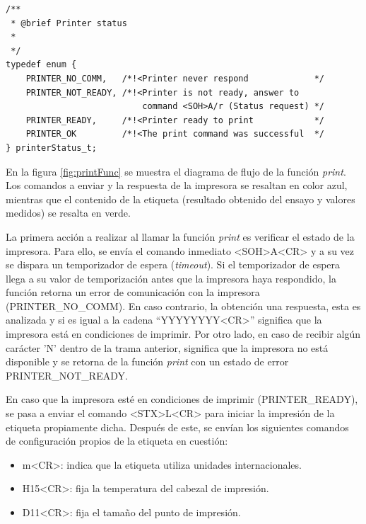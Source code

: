  \begin{lstlisting}[label=cod:print_h,caption=Prototipo función print.]
/**
 * @brief Printer status
 * 
 */
typedef enum {
	PRINTER_NO_COMM,   /*!<Printer never respond             */
	PRINTER_NOT_READY, /*!<Printer is not ready, answer to 
	                       command <SOH>A/r (Status request) */
	PRINTER_READY,     /*!<Printer ready to print            */
	PRINTER_OK         /*!<The print command was successful  */
} printerStatus_t;
\end{lstlisting}

En la figura \ref{fig:printFunc} se muestra el diagrama de flujo de la función \textit{print}. Los comandos a enviar y la respuesta de la impresora se resaltan en color azul, mientras que el contenido de la etiqueta (resultado obtenido del ensayo y valores medidos) se resalta en verde.

La primera acción a realizar al llamar la función \textit{print} es verificar el estado de la impresora. Para ello, se envía el comando inmediato \textless{}SOH\textgreater{}A\textless{}CR\textgreater{} y a su vez se dispara un temporizador de espera (\textit{timeout}). Si el temporizador de espera llega a su valor de temporización antes que la impresora haya respondido, la función retorna un error de comunicación con la impresora (PRINTER\_NO\_COMM). En caso contrario, la obtención una respuesta, esta es analizada y si es igual a la cadena ``YYYYYYYY\textless{}CR\textgreater{}'' significa que la impresora está en condiciones de imprimir. Por otro lado, en caso de recibir algún carácter 'N' dentro de la trama anterior, significa que la impresora no está disponible y se retorna de la función \textit{print} con un estado de error PRINTER\_NOT\_READY.

En caso que la impresora esté en condiciones de imprimir (PRINTER\_READY), se pasa a enviar el comando \textless{}STX\textgreater{}L\textless{}CR\textgreater{} para iniciar la impresión de la etiqueta propiamente dicha. Después de este, se envían los siguientes comandos de configuración propios de la etiqueta en cuestión:
\begin{itemize}
\item m\textless{}CR\textgreater{}: indica que la etiqueta utiliza unidades internacionales.
\item H15\textless{}CR\textgreater{}: fija la temperatura del cabezal de impresión.
\item D11\textless{}CR\textgreater{}: fija el tamaño del punto de impresión.
\end{itemize}

